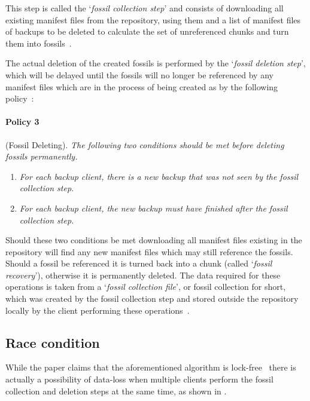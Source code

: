 This step is called the `\textit{fossil collection step}' and consists of downloading
all existing manifest files from the repository, using them and a list of manifest files
of backups to be deleted to calculate the set of unreferenced chunks and turn them into
fossils~\cite[section `Two Step Fossil Deletion']{Duplicacy}.

The actual deletion of the created fossils is performed by the `\textit{fossil deletion step}',
which will be delayed until the fossils will no longer be referenced by any manifest files
which are in the process of being created as by the following policy~\cite{Duplicacy}:

\begin{samepage}
    \paragraph{Policy 3}\label{para:policy3} (Fossil Deleting).
    \textit{The following two conditions should be met before deleting fossils permanently.}
    \begin{enumerate}
        \item \textit{
            For each backup client, there is a new backup that was not seen by
            the fossil collection step.
        }
        \item \textit{
            For each backup client, the new backup must have finished after
            the fossil collection step.
        }
    \end{enumerate}
\end{samepage}

Should these two conditions be met downloading all manifest files existing in the
repository will find any new manifest files which may still reference the fossils.
Should a fossil be referenced it is turned back into a chunk (called `\textit{fossil recovery}'),
otherwise it is permanently deleted.
The data required for these operations is taken from a `\textit{fossil collection file}',
or fossil collection for short, which was created by the fossil collection step
and stored outside the repository locally by the client performing these
operations~\cite[section `Two Step Fossil Deletion']{Duplicacy}. 

\subsection{Race condition}\label{sec:race-condition}

While the paper claims that the aforementioned algorithm is lock-free~\cite[Theorem 2]{Duplicacy}
there is actually a possibility of data-loss when multiple clients perform the fossil
collection and deletion steps at the same time, as shown in .

